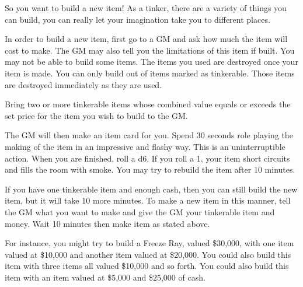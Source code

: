 \documentclass[green]{LRSguildcamp1}
\begin{document}
\name{\gTinkering{}}

So you want to build a new item! As a tinker, there are a variety of things you can build, you can really let your imagination take you to different places. 

In order to build a new item, first go to a GM and ask how much the item will cost to make. The GM may also tell you the limitations of this item if built. You may not be able to build some items. The items you used are destroyed once your item is made. You can only build out of items marked as tinkerable. Those items are destroyed immediately as they are used. 

Bring two or more tinkerable items whose combined value equals or exceeds the set price for the item you wish to build to the GM.

The GM will then make an item card for you. Spend 30 seconds role playing the making of the item in an impressive and flashy way. This is an uninterruptible action. When you are finished, roll a d6.  If you roll a 1, your item short circuits and fills the room with smoke. You may try to rebuild the item after 10 minutes. 

If you have one tinkerable item and enough cash, then you can still build the new item, but it will take 10 more minutes. To make a new item in this manner, tell the GM what you want to make and give the GM your tinkerable item and money. Wait 10 minutes then make item as stated above. 

For instance, you might try to build a Freeze Ray, valued \$30,000, with one item valued at \$10,000 and another item valued at \$20,000. You could also build this item with three items all valued \$10,000 and so forth. You could also build this item with an item valued at \$5,000 and \$25,000 of cash. 

\end{document}

